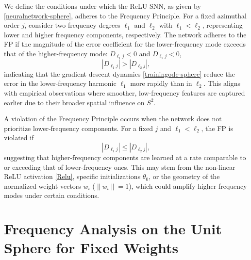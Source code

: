 \documentclass[review,onefignum,onetabnum,onealgnum]{siamart250106}
\numberwithin{theorem}{section}
\begin{document}
We define the conditions under which the ReLU SNN, as given by \eqref{neuralnetwork-sphere}, adheres to the Frequency Principle. For a fixed azimuthal order \( j \), consider two frequency degrees \( \ell_1 \) and \( \ell_2 \) with \( \ell_1 < \ell_2 \), representing lower and higher frequency components, respectively. The network adheres to the FP if the magnitude of the error coefficient for the lower-frequency mode exceeds that of the higher-frequency mode: $D_{\ell_1 j}<0$ and $D_{\ell_2 j} < 0$,
\begin{equation}
    |D_{\ell_1 j}| > |D_{\ell_2 j}|,
\end{equation}
indicating that the gradient descent dynamics \eqref{trainingode-sphere} reduce the error in the lower-frequency harmonic \( \ell_1 \) more rapidly than in \( \ell_2 \). This aligns with empirical observations where smoother, low-frequency features are captured earlier due to their broader spatial influence on \( S^2 \).


A violation of the Frequency Principle occurs when the network does not prioritize lower-frequency components. For a fixed \( j \) and \( \ell_1 < \ell_2 \), the FP is violated if
\begin{equation}
    |D_{\ell_1 j}| \leq |D_{\ell_2 j}|,
\end{equation}
suggesting that higher-frequency components are learned at a rate comparable to or exceeding that of lower-frequency ones. This may stem from the non-linear ReLU activation \eqref{Relu}, specific initializations \( \theta_0 \), or the geometry of the normalized weight vectors \( w_i \) (\( \|w_i\| = 1 \)), which could amplify higher-frequency modes under certain conditions.
























\section{Frequency Analysis on the Unit Sphere for Fixed Weights}
\label{Sec:SphericalAnalysisFW}
\end{document}

